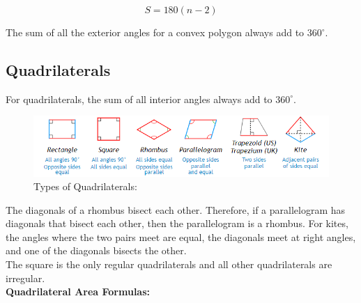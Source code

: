 \documentclass{article}
\begin{document}
            \begin{equation*}
                S = 180(n-2)
            \end{equation*}

            \noindent The sum of all the exterior angles for a convex polygon always add to
            $360^\circ$.

        \subsection{Quadrilaterals}
            For quadrilaterals, the sum of all interior angles always add to $360^\circ$.

            \begin{figure} [hbt!]
                \centering
                \caption*{\color{purple}Types of Quadrilaterals:\color{black}}
                \includegraphics[scale = 0.8] {Resources/Unit3Polygons/quad.PNG}
            \end{figure}

            \noindent The diagonals of a rhombus bisect each other. Therefore, if a parallelogram
            has diagonals that bisect each other, then the parallelogram is a rhombus. For kites,
            the angles where the two pairs meet are equal, the diagonals meet at right angles, and
            one of the diagonals bisects the other. \\

            \noindent The square is the only regular quadrilaterals and all other quadrilaterals are
            irregular. \\

            \pagebreak
            \noindent \color{purple} \textbf{Quadrilateral Area Formulas:} \color{black} \\
\end{document}
